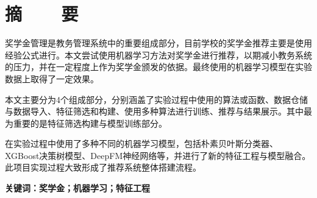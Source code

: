 %
%
%
%
%

\vspace*{-11mm}

\begin{center}
  \heiti{}\textbf{\thesisTitle}
\end{center}

\vspace*{2mm}

{\let\clearpage\relax \chapter*{\textmd{摘~~~~要}}}
\setcounter{page}{1}

\vspace*{1mm}

\setlength{\parskip}{0em}

奖学金管理是教务管理系统中的重要组成部分，目前学校的奖学金推荐主要是使用经验公式进行。本文尝试使用机器学习方法对奖学金进行推荐，以期减小教务系统的压力，并在一定程度上作为奖学金颁发的依据。最终使用的机器学习模型在实验数据上取得了一定效果。

本文主要分为4个组成部分，分别涵盖了实验过程中使用的算法或函数、数据仓储与数据导入、特征筛选和构建、使用多种算法进行训练、推荐与结果展示。其中最为重要的是特征筛选构建与模型训练部分。

在实验过程中使用了多种不同的机器学习模型，包括朴素贝叶斯分类器、XGBoost决策树模型、DeepFM神经网络等，并进行了新的特征工程与模型融合。此项目实现过程大致形成了推荐系统整体搭建流程。

\vspace{4ex}\noindent\textbf{\heiti 关键词：奖学金；机器学习；特征工程}
\newpage

\vspace*{-2mm}

